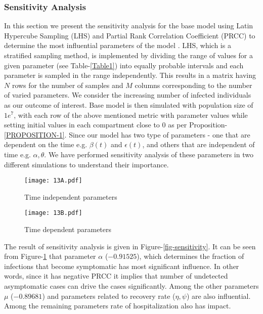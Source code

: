 \documentclass[10pt]{wlscirep}
\begin{document}
\subsubsection*{Sensitivity Analysis}
In this section we present the sensitivity analysis for the base model using Latin Hypercube Sampling (LHS) and Partial Rank Correlation Coefficient (PRCC) to determine the most influential parameters of the model \cite{Marino2008}. LHS, which is a stratified sampling method, is implemented by dividing the range of values for a given parameter (see Table-\ref{Table1}) into equally probable intervals and each parameter is sampled in the range independently. This results in a matrix having $N$ rows for the number of samples and $M$ columns corresponding to the number of varied parameters. We consider the increasing number of infected individuals as our outcome of interest. Base model is then simulated with population size of $1e^7$, with each row of the above mentioned metric with parameter values while setting initial values in each compartment close to 0 as per Proposition-\ref{PROPOSITION-1}. Since our model has two type of parameters - one that are dependent on the time e.g. $\beta(t)$ and $\epsilon(t)$, and others that are independent of time e.g. $\alpha, \theta$. We have performed sensitivity analysis of these parameters in two different simulations to understand their importance.
%
\begin{figure*}[t!]
	\centering
	\begin{subfigure}{\linewidth}
		\centering
		\texttt{[image: 13A.pdf]}
		\caption{Time independent parameters}
		\label{fig-sensitivity-A}
	\end{subfigure}

	\begin{subfigure}{\linewidth}
		\centering
		\texttt{[image: 13B.pdf]}
		\caption{Time dependent parameters }
		\label{fig-sensitivity-B}
	\end{subfigure}
	\caption{Partial rank correlation coefficients of parameters  with cases (fraction of the population) from 120 LHS samples}
	\label{fig-sensitivity}
\end{figure*}
The result of sensitivity analysis is given in Figure-\ref{fig-sensitivity}. 
%
%
It can be seen from Figure-\ref{fig-sensitivity-A} that parameter $\alpha$ ($-0.91525$), which determines the fraction of infections that become symptomatic has most significant influence. In other words, since it has negative PRCC it implies  that number of undetected asymptomatic cases can drive the cases significantly. Among the other parameters $\mu$  ($-0.89681$) and parameters related to recovery rate ($\eta, \psi$) are also influential. Among the remaining parameters rate of hospitalization also has impact. 
\end{document}
